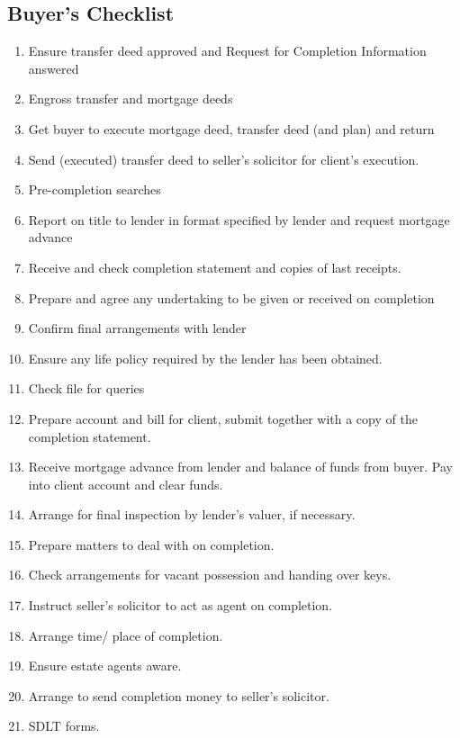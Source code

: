 \documentclass[
]{article}
\providecommand{\tightlist}{%
  \setlength{\itemsep}{0pt}\setlength{\parskip}{0pt}}
\begin{document}
\hypertarget{buyers-checklist}{%
\subsection{Buyer's Checklist}\label{buyers-checklist}}

\begin{enumerate}
\def\labelenumi{\arabic{enumi}.}
\tightlist
\item
  Ensure transfer deed approved and Request for Completion Information
  answered
\item
  Engross transfer and mortgage deeds
\item
  Get buyer to execute mortgage deed, transfer deed (and plan) and
  return
\item
  Send (executed) transfer deed to seller's solicitor for client's
  execution.
\item
  Pre-completion searches
\item
  Report on title to lender in format specified by lender and request
  mortgage advance
\item
  Receive and check completion statement and copies of last receipts.
\item
  Prepare and agree any undertaking to be given or received on
  completion
\item
  Confirm final arrangements with lender
\item
  Ensure any life policy required by the lender has been obtained.
\item
  Check file for queries
\item
  Prepare account and bill for client, submit together with a copy of
  the completion statement.
\item
  Receive mortgage advance from lender and balance of funds from buyer.
  Pay into client account and clear funds.
\item
  Arrange for final inspection by lender's valuer, if necessary.
\item
  Prepare matters to deal with on completion.
\item
  Check arrangements for vacant possession and handing over keys.
\item
  Instruct seller's solicitor to act as agent on completion.
\item
  Arrange time/ place of completion.
\item
  Ensure estate agents aware.
\item
  Arrange to send completion money to seller's solicitor.
\item
  SDLT forms.
\end{enumerate}
\end{document}
